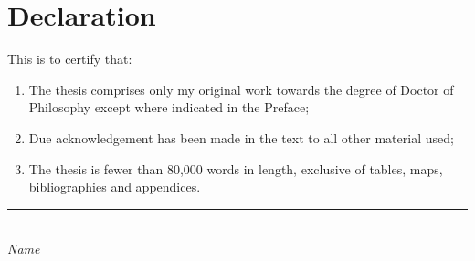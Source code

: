 
\chapter*{Declaration}


This is to certify that:
\begin{enumerate}
\item The thesis comprises only my original work towards the degree of Doctor
of Philosophy except where indicated in the Preface;
\item Due acknowledgement has been made in the text to all other material
used;
\item The thesis is fewer than 80,000 words in length, exclusive of tables,
maps, bibliographies and appendices.
\end{enumerate}
\vspace{3cm} \rule{70mm}{0.1mm}\\ \emph{Name}